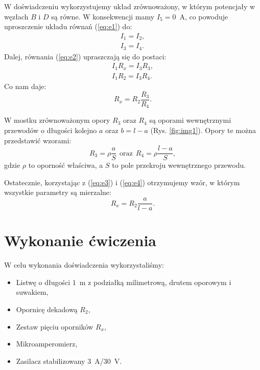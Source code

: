 \documentclass[12pt,a4paper]{article}
\numberwithin{equation}{section}
\begin{document}
W doświadczeniu wykorzystujemy układ zrównoważony, w którym potencjały w węzłach $B$ i $D$ są równe. W konsekwencji mamy $I_5 = 0$~A, co powoduje uproszczenie układu równań (\ref{eq:e1}) do:
\begin{equation}
	\begin{split}
	I_1 = I_2, \\
	I_3 = I_4.
	\end{split}
\end{equation}
Dalej, równania (\ref{eq:e2}) upraszczają się do postaci:
\begin{equation}
	\begin{split}
	I_1 R_x = I_3 R_3 , \\
	I_1 R_2 = I_3 R_4.
	\end{split}
\end{equation}
Co nam daje:
\begin{equation}
	R_x = R_2\frac{R_3}{R_4}.
	\label{eq:e3}
\end{equation}

W mostku zrównoważonym opory $R_3$ oraz $R_4$ są oporami wewnętrznymi przewodów o długości kolejno $a$ oraz $b = l - a$ (Rys. \ref{fig:img1}). Opory te można przedstawić wzorami:
\begin{equation}
		R_3 = \rho\frac{a}{S}~~\textrm{oraz}~~R_4 = \rho \frac{l - a}{S},
		\label{eq:e4}
\end{equation}
gdzie $\rho$ to oporność właściwa, a $S$ to pole przekroju wewnętrznego przewodu.

Ostatecznie, korzystając z (\ref{eq:e3}) i (\ref{eq:e4}) otrzymujemy wzór, w którym wszystkie parametry są mierzalne:
\begin{equation}
	R_x = R_2 \frac{a}{l - a}.
	\label{eq:rx}
\end{equation}

\pagebreak
\section{Wykonanie ćwiczenia}
\label{sec:2}


W celu wykonania doświadczenia wykorzystaliśmy:
\begin{itemize}
	\item Listwę o długości $1$~m z podziałką milimetrową, drutem oporowym i suwakiem,
	\item Opornicę dekadową $R_2$,
	\item Zestaw pięciu oporników $R_x$,
	\item Mikroamperomierz,
	\item Zasilacz stabilizowany $3$~A/$30$~V.
\end{itemize}
\end{document}
